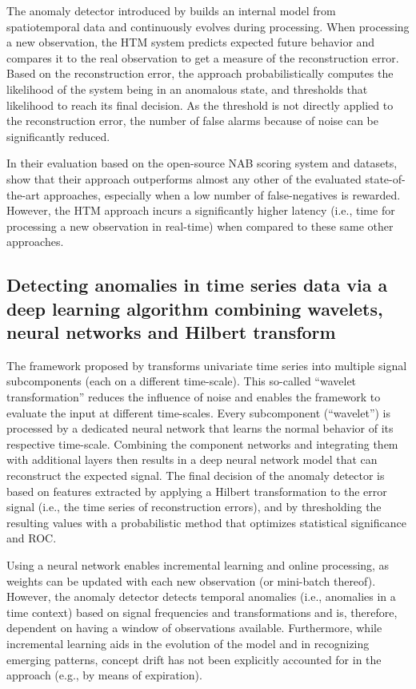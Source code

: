 The anomaly detector introduced by \citet{ahmad_unsupervised_2017} builds an internal model from spatiotemporal data and continuously evolves during processing. When processing a new observation, the HTM system predicts expected future behavior and compares it to the real observation to get a measure of the reconstruction error. Based on the reconstruction error, the approach probabilistically computes the likelihood of the system being in an anomalous state, and thresholds that likelihood to reach its final decision. As the threshold is not directly applied to the reconstruction error, the number of false alarms because of noise can be significantly reduced.

In their evaluation based on the open-source NAB scoring system and datasets, \citet{ahmad_unsupervised_2017} show that their approach outperforms almost any other of the evaluated state-of-the-art approaches, especially when a low number of false-negatives is rewarded. However, the HTM approach incurs a significantly higher latency (i.e., time for processing a new observation in real-time) when compared to these same other approaches.


\subsection{Detecting anomalies in time series data via a deep learning algorithm combining wavelets, neural networks and Hilbert transform \citep{kanarachos_detecting_2017}}
The framework proposed by \citet{kanarachos_detecting_2017} transforms univariate time series into multiple signal subcomponents (each on a different time-scale). This so-called ``wavelet transformation'' reduces the influence of noise and enables the framework to evaluate the input at different time-scales. Every subcomponent (``wavelet'') is processed by a dedicated neural network that learns the normal behavior of its respective time-scale. Combining the component networks and integrating them with additional layers then results in a deep neural network model that can reconstruct the expected signal. The final decision of the anomaly detector is based on features extracted by applying a Hilbert transformation to the error signal (i.e., the time series of reconstruction errors), and by thresholding the resulting values with a probabilistic method that optimizes statistical significance and ROC.

Using a neural network enables incremental learning and online processing, as weights can be updated with each new observation (or mini-batch thereof). However, the anomaly detector detects temporal anomalies (i.e., anomalies in a time context) based on signal frequencies and transformations and is, therefore, dependent on having a window of observations available. Furthermore, while incremental learning aids in the evolution of the model and in recognizing emerging patterns, concept drift has not been explicitly accounted for in the approach (e.g., by means of expiration).

